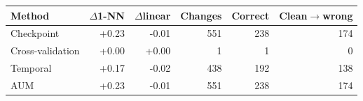\begin{tabular}{lrrrrr}
\toprule
Method & $\Delta$1-NN & $\Delta$linear & Changes & Correct & Clean$\to$wrong \\
\midrule
Checkpoint & +0.23 & -0.01 & 551 & 238 & 174 \\
Cross-validation & +0.00 & +0.00 & 1 & 1 & 0 \\
Temporal & +0.17 & -0.02 & 438 & 192 & 138 \\
AUM & +0.23 & -0.01 & 551 & 238 & 174 \\
\bottomrule
\end{tabular}
